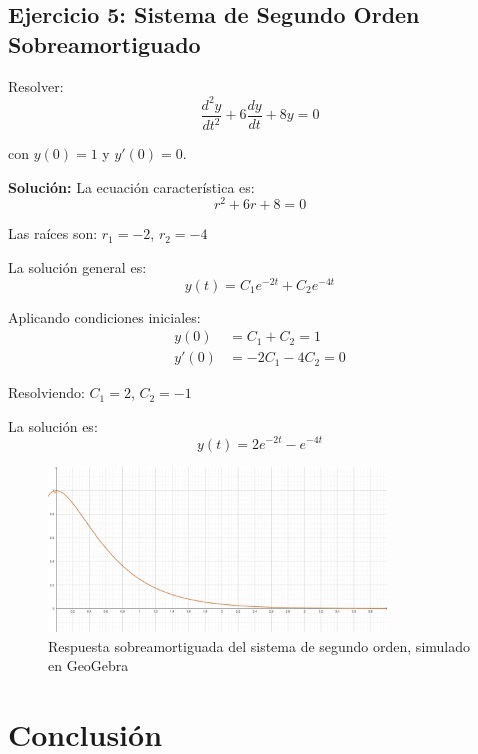 \documentclass[12pt]{article}
\begin{document}
\subsection{Ejercicio 5: Sistema de Segundo Orden Sobreamortiguado}

Resolver:
\begin{equation}
    \frac{d^2 y}{dt^2} + 6 \frac{dy}{dt} + 8y = 0
\end{equation}

con $y(0) = 1$ y $y'(0) = 0$.

\textbf{Solución:}
La ecuación característica es:
\begin{equation}
    r^2 + 6r + 8 = 0
\end{equation}

Las raíces son: $r_1 = -2$, $r_2 = -4$

La solución general es:
\begin{equation}
    y(t) = C_1 e^{-2t} + C_2 e^{-4t}
\end{equation}

Aplicando condiciones iniciales:
\begin{align}
    y(0) &= C_1 + C_2 = 1 \\
    y'(0) &= -2C_1 - 4C_2 = 0
\end{align}

Resolviendo: $C_1 = 2$, $C_2 = -1$

La solución es:
\begin{equation}
    y(t) = 2e^{-2t} - e^{-4t}
\end{equation}

\begin{figure}[H]
    \centering
    \includegraphics[width=0.8\textwidth]{imagen-ejercicio5.png}
    \caption{Respuesta sobreamortiguada del sistema de segundo orden, simulado en GeoGebra}
\end{figure}

\section{Conclusión}
\end{document}
